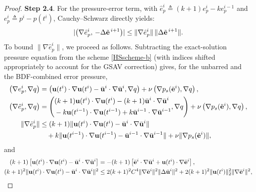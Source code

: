 \documentclass{article}
\theoremstyle{definition}                   %
\begin{document}
\begin{proof}
\vskip 0.2cm
{\bf Step 2.4}. 
For the pressure-error term, with
$\hat e_p^{i}\triangleq (k+1)e^i_p - k e^{i-1}_p$ and
$e^i_p\triangleq p^i-p(t^i)$, Cauchy--Schwarz directly yields:
\begin{align}
|\bigl(\nabla \hat e_p^{i},\,
- \Delta \tilde{\bf e}^{\,i+1}
\bigr)|
\le
\|\nabla \hat e_p^{i}\|
\,
\|\Delta \tilde{\bf e}^{\,i+1}\|.
\label{5.36}
\end{align}
%
To bound $\|\nabla\hat e^i_p\|$, we proceed as follows. Subtracting the
exact-solution pressure equation from the scheme \eqref{HSscheme-b} (with
indices shifted appropriately to account for the GSAV correction) gives,
for the unbarred and the BDF-combined error pressure,
\begin{align}
\left(\nabla e^i_p, \nabla q\right) &=
\left({\mathbf{u}}(t^i)\cdot\nabla{\mathbf{u}}(t^i)-\bar{\mathbf{u}}^i\cdot\nabla\bar{\mathbf{u}}^i,\nabla q\right)
+ \nu \left(\nabla p_s(\bar{\mathbf{e}}^i), \nabla q\right),
\label{5.37-new}
\\
\left(\nabla \hat{e}^i_p, \nabla q\right)
&= \left(
\begin{aligned}
&(k+1) {\mathbf{u}}(t^i)\cdot\nabla{\mathbf{u}}(t^i)
-(k+1)\bar{\mathbf{u}}^i\cdot\nabla\bar{\mathbf{u}}^i \\
&- k{\mathbf{u}}(t^{i-1})\cdot\nabla{\mathbf{u}}(t^{i-1})
+ k \bar{\mathbf{u}}^{i-1}\cdot\nabla\bar{\mathbf{u}}^{i-1}
\end{aligned},
\nabla q \right)
+ \nu \left(\nabla p_s(\tilde{\mathbf{e}}^i), \nabla q\right),
\label{5.38-new}
\\
\|\nabla\hat{e}^i_p\|
&\le (k+1) \|{\mathbf{u}}(t^i)\cdot\nabla{\mathbf{u}}(t^i) - \bar{\mathbf{u}}^i \cdot\nabla\bar{\mathbf{u}}^i\|
\notag\\
& \quad + k \|{\mathbf{u}}(t^{i-1})\cdot\nabla{\mathbf{u}}(t^{i-1})
- \bar{\mathbf{u}}^{i-1} \cdot\nabla\bar{\mathbf{u}}^{i-1}\|
+ \nu \| \nabla p_s(\tilde{\mathbf{e}}^i)\|,
\label{5.39-new}
\end{align}
and
\begin{align}
(k+1) \left[ {\bf{u}}(t^i)\cdot\nabla{\bf{u}}(t^i) - \bar{\bf{u}}^i \cdot\nabla\bar{\bf{u}}^i\right]
&= -(k+1) \left[ \bar{\bf{e}}^i\cdot\nabla\bar{\bf{u}}^i
  + {\bf{u}}(t^i) \cdot\nabla\bar{\bf{e}}^i \right],
\label{5.40-new}
  \\
(k+1)^2 \| {\bf{u}}(t^i)\cdot\nabla{\bf{u}}(t^i) - \bar{\bf{u}}^i \cdot\nabla\bar{\bf{u}}^i \|^2
&\le  2(k+1)^2 C^4 \| \nabla\bar{\bf{e}}^i \|^2 \|\Delta \bar{\bf{u}}^i\|^2 
  + 2(k+1)^2 \| {\bf{u}}(t^i)\|^2_2  
      \| \nabla\bar{\bf{e}}^i \|^2,

\end{align}
\end{proof}
\end{document}
